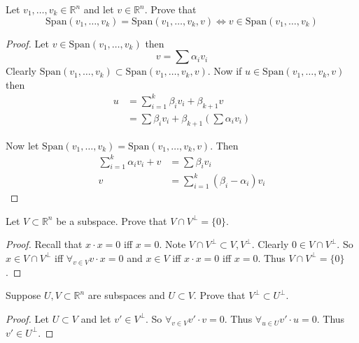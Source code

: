 \begin{exercise} \label{e1.3.7}
    Let \(v_1,\ldots,v_k \in \mathbb{R}^n\) and let \(v \in \mathbb{R}^n\). Prove that
    \[\text{Span}(v_1,\ldots,v_k)=\text{Span}(v_1,\ldots,v_k,v) \iff v \in \text{Span}(v_1,\ldots,v_k)\]
    
    \begin{proof}
        Let \(v \in \text{Span}(v_1,\ldots,v_k)\) then
        \[v=\sum \alpha_i v_i\]
        Clearly \(\text{Span}(v_1,\ldots,v_k) \subset \text{Span}(v_1,\ldots,v_k,v)\). Now if \(u\in \text{Span}(v_1,\ldots,v_k,v)\) then
        \begin{align*}
            u &= \sum_{i=1}^k \beta_i v_i + \beta_{k+1}v \\
            &= \sum \beta_i v_i + \beta_{k+1}(\sum \alpha_i v_i)
        \end{align*}
        
        Now let \(\text{Span}(v_1,\ldots,v_k)=\text{Span}(v_1,\ldots,v_k,v)\). Then
        \begin{align*}
            \sum_{i=1}^k \alpha_i v_i + v &= \sum \beta_i v_i \\
            v &= \sum_{i=1}^k (\beta_i-\alpha_i)v_i
        \end{align*}
    \end{proof}
\end{exercise} %

\begin{exercise} \label{e1.3.8}
    Let \(V \subset \mathbb{R}^n\) be a subspace. Prove that \(V \cap V^{\perp}=\{0\}\).
    
    \begin{proof}
        Recall that \(x \cdot x = 0\) iff \(x=0\). Note \(V \cap V^{\perp} \subset V, V^{\perp}\). Clearly \( 0 \in V \cap V^\perp \). So \( x \in V \cap V^{\perp}\) iff \( \forall_{v \in V} v \cdot x = 0 \) and \(x \in V\) iff \(x \cdot x = 0\) iff \(x=0\). Thus \(V \cap V^{\perp}=\{0\}\).
    \end{proof}
\end{exercise} %

\begin{exercise} \label{e1.3.9}
    Suppose \(U,V \subset \mathbb{R}^n\) are subspaces and \(U \subset V\). Prove that \(V^{\perp} \subset U^{\perp}\).
    
    \begin{proof}
        Let \(U \subset V\) and let \(v'\in V^{\perp}\). So \(\forall_{v \in V} v' \cdot v=0\). Thus \(\forall_{u \in U} v' \cdot u=0\). Thus \(v' \in U^{\perp}\).
    \end{proof}
\end{exercise} %

